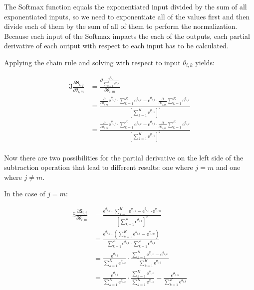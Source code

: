 \documentclass[a4paper]{article}
\newcommand{\euler}{\mathrm{e}}
\newcommand{\matr}[1]{\mathbf{#1}}
\begin{document}
The Softmax function equals the exponentiated input divided by the sum of all exponentiated inputs, so we need to exponentiate all of the values first and then divide each of them by the sum of all of them to perform the normalization. Because each input of the Softmax impacts the each of the outputs, each partial derivative of each output with respect to each input has to be calculated. 

Applying the chain rule and solving with respect to input $\theta_{i,k}$ yields:

\begin{alignat*}{3}
    \frac{\partial \matr{S}_{i,j}}{\partial \theta_{i,m}} &= \frac{\partial \frac{\euler^{\theta_{i,j}}}{\sum_{k=1}^{K} \euler^{\theta_{i,k}}}}{\partial \theta_{i,m}} \\
    &= \frac{\frac{\partial}{\partial \theta_{i,m}} \euler^{\theta_{i,j}} \cdot \sum_{k=1}^{K} \euler^{\theta_{i,k}} - \euler^{\theta_{i,j}} \cdot \frac{\partial}{\partial \theta_{i,m}} \sum_{k=1}^{K} \euler^{\theta_{i,k}}}{[\sum_{k=1}^{K} \euler^{\theta_{i,k}}]^2} \\
    &= \frac{\frac{\partial}{\partial \theta_{i,m}} \euler^{\theta_{i,j}} \cdot \sum_{k=1}^{K} \euler^{\theta_{i,k}} - \euler^{\theta_{i,j}} \cdot \frac{\partial}{\partial \theta_{i,m}} \sum_{k=1}^{K} \euler^{\theta_{i,k}}}{[\sum_{k=1}^{K} \euler^{\theta_{i,k}}]^2} \\
\end{alignat*}

Now there are two possibilities for the partial derivative on the left side of the subtraction operation that lead to different results: one where $j=m$ and one where $j\not=m$.

In the case of $j=m$:

\begin{alignat*}{5}
    \frac{\partial \matr{S}_{i,j}}{\partial \theta_{i,m}} &= 
    \frac{\euler^{\theta_{i,j}} \cdot \sum_{k=1}^{K} \euler^{\theta_{i,k}} - \euler^{\theta_{i,j}} \cdot \euler^{\theta_{i,m}}}{[\sum_{k=1}^{K} \euler^{\theta_{i,k}}]^2} \\
    &= \frac{\euler^{\theta_{i,j}} \cdot (\sum_{k=1}^{K} \euler^{\theta_{i,k}} - \euler^{\theta_{i,m}})}{\sum_{k=1}^{K} \euler^{\theta_{i,k}} \cdot \sum_{k=1}^{K} \euler^{\theta_{i,k}}} \\
    &= \frac{\euler^{\theta_{i,j}}}{\sum_{k=1}^{K} \euler^{\theta_{i,k}}} \cdot \frac{\sum_{k=1}^{K} \euler^{\theta_{i,k}} - \euler^{\theta_{i,m}}}{\sum_{k=1}^{K} \euler^{\theta_{i,k}}} \\
    &= \frac{\euler^{\theta_{i,j}}}{\sum_{k=1}^{K} \euler^{\theta_{i,k}}} \cdot \frac{\sum_{k=1}^{K} \euler^{\theta_{i,k}}}{\sum_{k=1}^{K} \euler^{\theta_{i,k}}} - \frac{\euler^{\theta_{i,m}}}{\sum_{k=1}^{K} \euler^{\theta_{i,k}}}
\end{alignat*}
\end{document}
